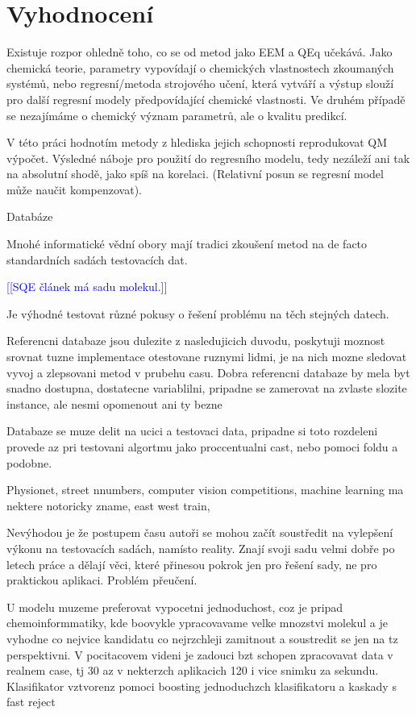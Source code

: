 \documentclass[
  color, %
  table, %
  lof,   %
  lot,   %
]{fithesis3}
\newcommand\todo[1]{\textcolor{blue}{[[#1]]}}
\begin{document}
\chapter{Vyhodnocení}

Existuje rozpor ohledně toho, co se od metod jako EEM a QEq učekává. Jako chemická teorie, parametry vypovídají o chemických vlastnostech zkoumaných systémů, nebo regresní/metoda strojového učení, která vytváří a výstup slouží pro další regresní modely předpovídající chemické vlastnosti. Ve druhém případě se nezajímáme o chemický význam parametrů, ale o kvalitu predikcí.

V této práci hodnotím metody z hlediska jejich schopnosti reprodukovat QM výpočet. Výsledné náboje pro použití do regresního modelu, tedy nezáleží ani tak na absolutní shodě, jako spíš na korelaci. (Relativní posun se regresní model může naučit kompenzovat).

Databáze

Mnohé informatické vědní obory mají tradici zkoušení metod na de facto standardních sadách testovacích dat.

\todo{SQE článek má sadu molekul.}

Je výhodné testovat různé pokusy o řešení problému na těch stejných datech.

Referencni databaze jsou dulezite z nasledujicich duvodu, poskytuji moznost srovnat tuzne implementace otestovane ruznymi lidmi, je na nich mozne sledovat vyvoj a zlepsovani metod v prubehu casu. Dobra referencni databaze by mela byt snadno dostupna, dostatecne variablilni, pripadne se zamerovat na zvlaste slozite instance, ale nesmi opomenout ani ty bezne

Databaze se muze delit na ucici a testovaci data, pripadne si toto rozdeleni provede az pri testovani algortmu jako proccentualni cast, nebo pomoci foldu a podobne.

Physionet, street nnumbers, computer vision competitions, machine learning ma nektere notoricky zname, east west train,

Nevýhodou je že postupem času autoři se mohou začít soustředit na vylepšení výkonu na testovacích sadách, namísto reality. Znají svoji sadu velmi dobře po letech práce a dělají věci, které přinesou pokrok jen pro řešení sady, ne pro praktickou aplikaci. Problém přeučení.

U modelu muzeme preferovat vypocetni jednoduchost, coz je pripad chemoinformmatiky, kde boovykle ypracovavame velke mnozstvi molekul a je vyhodne co nejvice kandidatu co nejrzchleji zamitnout a soustredit se jen na tz perspektivni. V pocitacovem videni je zadouci bzt schopen zpracovavat data v realnem case, tj 30 az v nekterzch aplikacich 120 i vice snimku za sekundu. Klasifikator vztvorenz pomoci boosting jednoduchzch klasifikatoru a kaskady s fast reject
\end{document}
